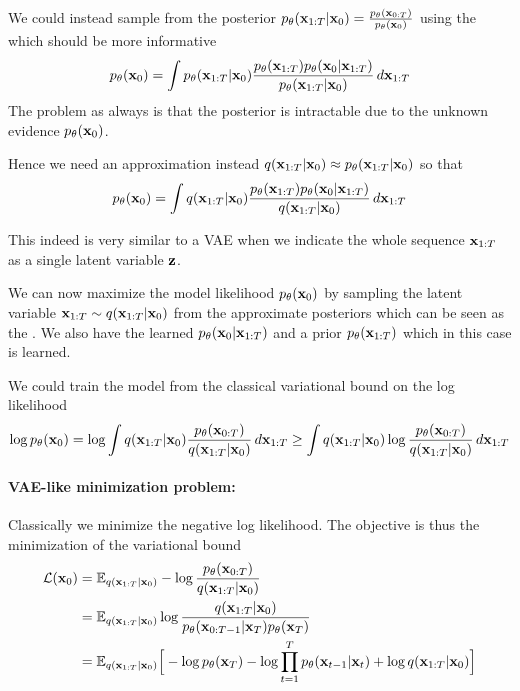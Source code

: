 We could instead sample from the posterior $p_{\theta}({\mathbf{x}}_{1:T} | {\mathbf{x}}_0) = \frac{p_{\theta}({\mathbf{x}}_{0:T})}{p_{\theta}({\mathbf{x}}_0)}$ using the  which should be more informative
\begin{equation}
    p_{\theta}({\mathbf{x}}_0) = \int p_{\theta}({\mathbf{x}}_{1:T} | {\mathbf{x}}_0) \frac{p_{\theta}({\mathbf{x}}_{1:T}) p_{\theta}({\mathbf{x}}_0 | {\mathbf{x}}_{1:T})}{p_{\theta}({\mathbf{x}}_{1:T} | {\mathbf{x}}_0)} \, d{\mathbf{x}}_{1:T}
\end{equation}
The problem as always is that the posterior is intractable due to the unknown evidence $p_{\theta}({\mathbf{x}}_0)$.

Hence we need an approximation instead $q({\mathbf{x}}_{1:T} | {\mathbf{x}}_0) \approx p_{\theta}({\mathbf{x}}_{1:T} | {\mathbf{x}}_0)$ so that
\begin{equation}
    p_{\theta}({\mathbf{x}}_0) = \int q({\mathbf{x}}_{1:T} | {\mathbf{x}}_0) \frac{p_{\theta}({\mathbf{x}}_{1:T}) p_{\theta}({\mathbf{x}}_0 | {\mathbf{x}}_{1:T})}{q({\mathbf{x}}_{1:T} | {\mathbf{x}}_0)} \, d{\mathbf{x}}_{1:T}
\end{equation}

This indeed is very similar to a VAE when we indicate the whole sequence ${\mathbf{x}}_{1:T}$ as a single latent variable ${\mathbf{z}}$.

We can now maximize the model likelihood $p_{\theta}({\mathbf{x}}_0)$ by sampling the latent variable ${\mathbf{x}}_{1:T} \sim q({\mathbf{x}}_{1:T} | {\mathbf{x}}_0)$ from the approximate posteriors which can be seen as the .
We also have the learned  $p_{\theta}({\mathbf{x}}_0 | {\mathbf{x}}_{1:T})$ and a prior $p_{\theta}({\mathbf{x}}_{1:T})$ which in this case is learned.

We could train the model from the classical variational bound on the log likelihood
\begin{equation}
    \log p_{\theta}({\mathbf{x}}_0) 
    = 
    \log \int q({\mathbf{x}}_{1:T} | {\mathbf{x}}_0) \frac{p_{\theta}({\mathbf{x}}_{0:T})}{q({\mathbf{x}}_{1:T} | {\mathbf{x}}_0)} \, d{\mathbf{x}}_{1:T}
    \geq 
    \int q({\mathbf{x}}_{1:T} | {\mathbf{x}}_0) \log \frac{p_{\theta}({\mathbf{x}}_{0:T})}{q({\mathbf{x}}_{1:T} | {\mathbf{x}}_0)} \, d{\mathbf{x}}_{1:T}
\end{equation}

\paragraph{VAE-like minimization problem:} 
Classically we minimize the negative log likelihood.
The objective is thus the minimization of the variational bound
\begin{align}\label{eq:VAE_loss}
    \mathcal{L}({\mathbf{x}}_0) & = \mathbb{E}_{q({\mathbf{x}}_{1:T} | {\mathbf{x}}_0)} - \log \frac{p_{\theta}({\mathbf{x}}_{0:T})}{q({\mathbf{x}}_{1:T} | {\mathbf{x}}_0)} \nonumber \\
     & = \mathbb{E}_{q({\mathbf{x}}_{1:T} | {\mathbf{x}}_0)} \log \frac{q({\mathbf{x}}_{1:T} | {\mathbf{x}}_0)}{p_{\theta}({\mathbf{x}}_{0:T-1}|{\mathbf{x}}_T) p_{\theta}({\mathbf{x}}_T)} \nonumber \\
     & = \mathbb{E}_{q({\mathbf{x}}_{1:T} | {\mathbf{x}}_0)} \Big[- \log p_{\theta}({\mathbf{x}}_T) - \log \prod_{t=1}^T p_{\theta}({\mathbf{x}}_{t-1}|{\mathbf{x}}_{t}) +  \log q({\mathbf{x}}_{1:T} | {\mathbf{x}}_0) \Big] 
\end{align}

